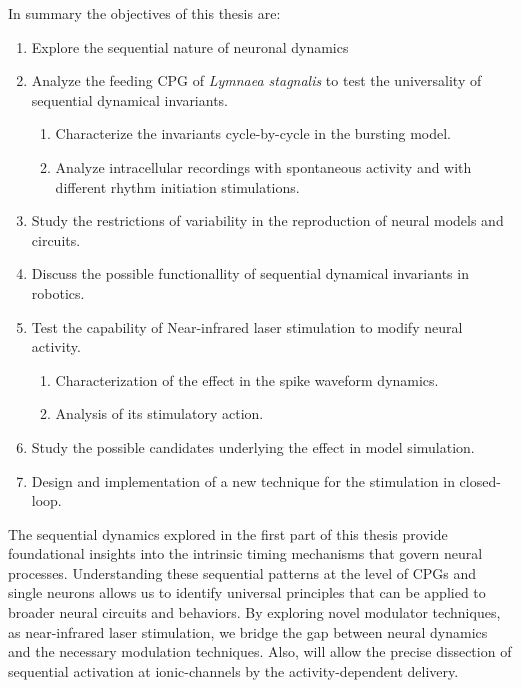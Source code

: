 In summary the objectives of this thesis are:
\begin{enumerate}
    \item Explore the sequential nature of neuronal dynamics
    \item Analyze the feeding CPG of \textit{Lymnaea stagnalis} to test the universality of sequential dynamical invariants.
    \begin{enumerate}
        \item Characterize the invariants cycle-by-cycle in the bursting model. 
        \item Analyze intracellular recordings with spontaneous activity and with different rhythm initiation stimulations. 
    \end{enumerate}
    \item Study the restrictions of variability in the reproduction of neural models and circuits.
    \item Discuss the possible functionallity of sequential dynamical invariants in robotics. 
    \item Test the capability of Near-infrared laser stimulation to modify neural activity. 
    \begin{enumerate}
        \item Characterization of the effect in the spike waveform dynamics. 
        \item Analysis of its stimulatory action. 
    \end{enumerate}
    \item Study the possible candidates underlying the effect in model simulation. 
    \item Design and implementation of a new technique for the stimulation in closed-loop. 
\end{enumerate}

The sequential dynamics explored in the first part of this thesis provide foundational insights into the intrinsic timing mechanisms that govern neural processes. Understanding these sequential patterns at the level of CPGs and single neurons allows us to identify universal principles that can be applied to broader neural circuits and behaviors. By exploring novel modulator techniques, as near-infrared laser stimulation, we bridge the gap between neural dynamics and the necessary modulation techniques. Also, will allow the precise dissection of sequential activation at ionic-channels by the activity-dependent delivery. 
